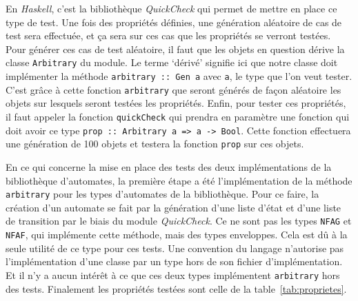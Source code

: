 En \textit{Haskell}, c'est la bibliothèque \textit{QuickCheck}\cite{quiceck} qui permet de
mettre en place ce type de test. Une fois des propriétés définies, une génération
aléatoire de cas de test sera effectuée, et ça sera sur ces cas que les
propriétés se verront testées. Pour générer ces cas de test aléatoire, il faut
que les objets en question dérive la classe \texttt{Arbitrary} du
module. Le terme `dérivé' signifie ici que notre classe doit implémenter la
méthode \texttt{arbitrary :: Gen a} avec \texttt{a},
le type que l'on veut tester. C'est grâce à cette fonction
\texttt{arbitrary} que seront générés de façon aléatoire les objets
sur lesquels seront testées les propriétés. Enfin, pour tester ces propriétés, il
faut appeler la fonction \texttt{quickCheck} qui prendra en
paramètre une fonction qui doit avoir ce type
\texttt{prop :: Arbitrary a => a -> Bool}. Cette fonction
effectuera une génération de 100 objets et testera la fonction
\texttt{prop} sur ces objets.

\vphantom{}

En ce qui concerne la mise en place des tests des deux implémentations de la
bibliothèque d'automates, la première étape a été l'implémentation de la méthode
\texttt{arbitrary} pour les types d'automates de la bibliothèque.
Pour ce faire, la création d'un automate se fait par la génération d'une liste
d'état et d'une liste de transition par le biais du module \textit{QuickCheck}.
Ce ne sont pas les types \texttt{NFAG} et
\texttt{NFAF}, qui implémente cette méthode, mais des types
enveloppes. Cela est dû à la seule utilité de ce type pour ces tests. Une
convention du langage n'autorise pas l'implémentation d'une classe par un type
hors de son fichier d'implémentation. Et il n'y a aucun intérêt à ce que ces deux
types implémentent \texttt{arbitrary} hors des tests. Finalement 
les propriétés testées sont celle de la table~\ref{tab:proprietes}.


